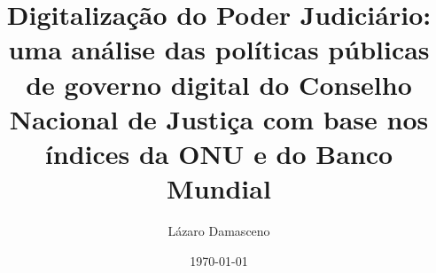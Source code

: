 \documentclass[12pt, a4paper]{report}
\begin{document}
\title{Digitalização do Poder Judiciário: uma análise das políticas públicas de governo digital do Conselho Nacional de Justiça com base nos índices da ONU e do Banco Mundial} 

\author{Lázaro Damasceno}
\date{\today}
\maketitle

\listoffigures
\listoftables
\tableofcontents











\end{document}
